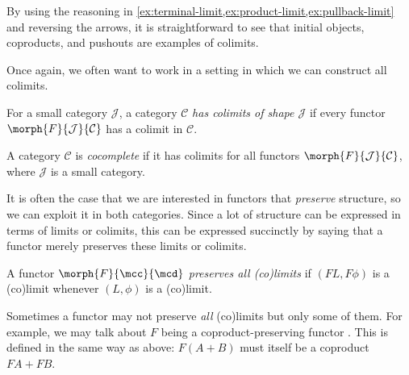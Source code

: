 \begin{example}
    By using the reasoning in
    \cref{ex:terminal-limit,ex:product-limit,ex:pullback-limit} and reversing
    the arrows, it is straightforward to see that initial objects, coproducts,
    and pushouts are examples of colimits.
\end{example}

Once again, we often want to work in a setting in which we can construct all
colimits.

\begin{definition}
    For a small category \(\mathcal{J}\), a category \(\mathcal{C}\)
    \emph{has colimits of shape \(\mathcal{J}\)} if every functor
    \(\morph{F}{\mathcal{J}}{\mathcal{C}}\) has a colimit in \(\mathcal{C}\).
\end{definition}

\begin{definition}
    A category \(\mathcal{C}\) is \emph{cocomplete} if it has colimits for all
    functors \(\morph{F}{\mathcal{J}}{\mathcal{C}}\), where \(\mathcal{J}\) is a
    small category.
\end{definition}

It is often the case that we are interested in functors that \emph{preserve}
structure, so we can exploit it in both categories.
Since a lot of structure can be expressed in terms of limits or colimits, this
can be expressed succinctly by saying that a functor merely preserves these
limits or colimits.

\begin{definition}
    A functor \(\morph{F}{\mcc}{\mcd}\) \emph{preserves all (co)limits} if
    \((FL,F\phi)\) is a (co)limit whenever \((L,\phi)\) is a (co)limit.
\end{definition}

Sometimes a functor may not preserve \emph{all} (co)limits but only some of
them.
For example, we may talk about \(F\) being a coproduct-preserving functor .
This is defined in the same way as above: \(F(A+B)\) must itself be a coproduct
\(FA + FB\).